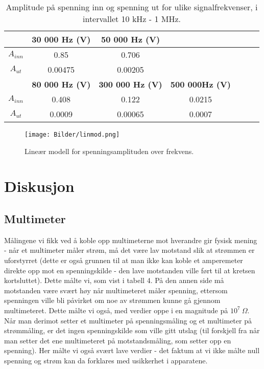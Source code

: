 \documentclass[norsk,a4paper,12pt]{article}
\begin{document}
\begin{table}
  \begin{center}
  \caption{Amplitude på spenning inn og spenning ut for ulike signalfrekvenser, i intervallet 10 kHz - 1 MHz.}
  \begin{tabular}{|c|c|c|c|c|c|c|} \hline
  \textit{} & \textbf{30 000 Hz (V)} & \textbf{50 000 Hz (V)} & \textbf{} \\ \hline
  \textbf{$A_{inn}$} & 0.85 & 0.706 & \\ \hline
  \textbf{$A_{ut}$} & 0.00475 & 0.00205 &   \\ \hline
  \textit{}  & \textbf{80 000 Hz (V)} & \textbf{300 000 Hz (V)} & \textbf{500 000Hz (V)} \\ \hline
  \textbf{$A_{inn}$}  & 0.408 & 0.122 & 0.0215 \\ \hline
  \textbf{$A_{ut}$} & 0.0009 & 0.00065 & 0.0007 \\ \hline
  \end{tabular}
  \end{center}
  \label{tab:amplitude}
\end{table}


\begin{figure}
\begin{center}
\texttt{[image: Bilder/linmod.png]}\\
\caption{Lineær modell for spenningsamplituden over frekvens.}\label{fig:linmod}
\end{center}
\end{figure}


\section{Diskusjon}

\subsection{Multimeter}

Målingene vi fikk ved å koble opp multimeterne mot hverandre gir fysisk mening - når et multimeter måler strøm, må det være lav motstand slik at strømmen er uforstyrret (dette er også grunnen til at man ikke kan koble et amperemeter direkte opp mot en spenningskilde - den lave motstanden ville ført til at kretsen kortsluttet). Dette målte vi, som vist i tabell 4. På den annen side må motstanden være svært høy når multimeteret måler spenning, ettersom spenningen ville bli påvirket om noe av strømmen kunne gå gjennom multimeteret. Dette målte vi også, med verdier oppe i en magnitude på $10^{7} \ \Omega$. Når man derimot setter et multimeter på spenningsmåling og et multimeter på strømmåling, er det ingen spenningskilde som ville gitt utslag (til forskjell fra når man setter det ene multimeteret på motstandsmåling, som setter opp en spenning). Her målte vi også svært lave verdier - det faktum at vi ikke målte null spenning og strøm kan da forklares med usikkerhet i apparatene.
\end{document}
